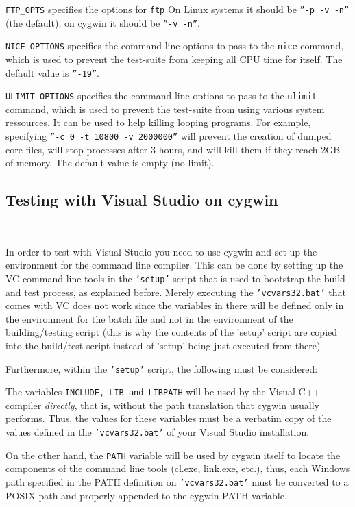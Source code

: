 {\tt FTP\_OPTS} specifies the options for {\tt ftp}   On Linux systems 
it should be {\tt ''-p -v -n''} (the default), on cygwin it should be {\tt ''-v -n''}.

{\tt NICE\_OPTIONS} specifies the command line options to pass to the
{\tt nice} command, which is used to prevent the test-suite from keeping
all CPU time for itself.  The default value is {\tt ''-19''}.

{\tt ULIMIT\_OPTIONS} specifies the command line options to pass to the
{\tt ulimit} command, which is used to prevent the test-suite from using
various system ressources.  It can be used to help killing looping programs.
For example, specifying {\tt ''-c 0 -t 10800 -v 2000000''} will prevent
the creation of dumped core files, will stop processes after 3 hours,
and will kill them if they reach 2GB of memory.
The default value is empty (no limit).

\subsection{Testing with Visual Studio on cygwin} ~

In order to test with Visual Studio you need to use cygwin and set up
the environment for the command line compiler. This can be done
by setting up the VC command line tools in the {\tt 'setup'} script
that is used to bootstrap the build and test process, as explained before.
Merely executing the {\tt 'vcvars32.bat'} that comes with VC does not work 
since the variables in there will be defined only in the environment for the batch 
file and not in the environment of the building/testing script (this is why
the contents of the 'setup' script are copied into the build/test script 
instead of 'setup' being just executed from there)

Furthermore, within the {\tt 'setup'} script, the following must be
considered: 

The variables {\tt INCLUDE, LIB and LIBPATH} will be used by the Visual C++ compiler
{\em directly}, that is, without the path translation that cygwin usually performs.
Thus, the values for these variables must be a verbatim copy of the values defined in
the {\tt 'vcvars32.bat'} of your Visual Studio installation.

On the other hand, the {\tt PATH} variable will be used by cygwin itself to locate the
components of the command line tools (cl.exe, link.exe, etc.), thus, each Windows
path specified in the PATH definition on {\tt 'vcvars32.bat'} must be converted to a
POSIX path and properly appended to the cygwin PATH variable.

